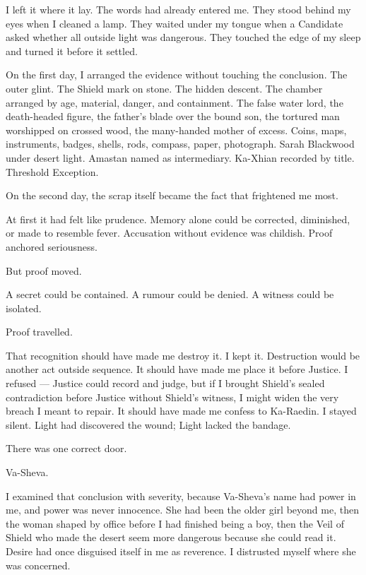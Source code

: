 I left it where it lay. The words had already entered me. They stood behind my eyes when I cleaned a lamp. They waited under my tongue when a Candidate asked whether all outside light was dangerous. They touched the edge of my sleep and turned it before it settled.\par

On the first day, I arranged the evidence without touching the conclusion. The outer glint. The Shield mark on stone. The hidden descent. The chamber arranged by age, material, danger, and containment. The false water lord, the death-headed figure, the father's blade over the bound son, the tortured man worshipped on crossed wood, the many-handed mother of excess. Coins, maps, instruments, badges, shells, rods, compass, paper, photograph. Sarah Blackwood under desert light. Amastan named as intermediary. Ka-Xhian recorded by title. Threshold Exception.\par

On the second day, the scrap itself became the fact that frightened me most.\par

At first it had felt like prudence. Memory alone could be corrected, diminished, or made to resemble fever. Accusation without evidence was childish. Proof anchored seriousness.\par

But proof moved.\par

A secret could be contained. A rumour could be denied. A witness could be isolated.\par

Proof travelled.\par

That recognition should have made me destroy it. I kept it. Destruction would be another act outside sequence. It should have made me place it before Justice. I refused --- Justice could record and judge, but if I brought Shield's sealed contradiction before Justice without Shield's witness, I might widen the very breach I meant to repair. It should have made me confess to Ka-Raedin. I stayed silent. Light had discovered the wound; Light lacked the bandage.\par

There was one correct door.\par

Va-Sheva.\par

I examined that conclusion with severity, because Va-Sheva's name had power in me, and power was never innocence. She had been the older girl beyond me, then the woman shaped by office before I had finished being a boy, then the Veil of Shield who made the desert seem more dangerous because she could read it. Desire had once disguised itself in me as reverence. I distrusted myself where she was concerned.\par

